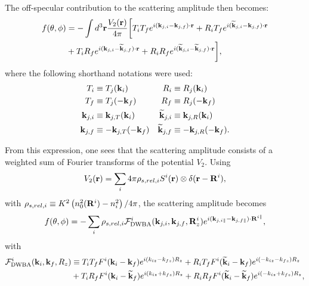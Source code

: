 The off-specular contribution to the scattering amplitude then becomes:
\begin{align*}
  f(\theta, \phi) &= -\int d^3\mathbf{r} \frac{V_2(\mathbf{r})}{4\pi} \biggl[ T_iT_fe^{i(\mathbf{k}_{j,i}-\mathbf{k}_{j,f})\cdot\mathbf{r}} + R_iT_fe^{i(\mathbf{\widetilde{k}}_{j,i}-\mathbf{k}_{j,f})\cdot\mathbf{r}} \\
   & + T_iR_fe^{i(\mathbf{k}_{j,i}-\mathbf{\widetilde{k}}_{j,f})\cdot\mathbf{r}} + R_iR_fe^{i(\mathbf{\widetilde{k}}_{j,i}-\mathbf{\widetilde{k}}_{j,f})\cdot\mathbf{r}} \biggr],
\end{align*}
where the following shorthand notations were used:
\begin{align*}
  T_i &\equiv  T_j(\mathbf{k}_i) & R_i &\equiv  R_j(\mathbf{k}_i)  \\
  T_f &\equiv  T_j(-\mathbf{k}_f) & R_f &\equiv  R_j(-\mathbf{k}_f) \\
  \mathbf{k}_{j,i} &\equiv \mathbf{k}_{j,T}(\mathbf{k}_i) & \mathbf{\widetilde{k}}_{j,i} &\equiv \mathbf{k}_{j,R}(\mathbf{k}_i)  \\
  \mathbf{k}_{j,f} &\equiv -\mathbf{k}_{j,T}(-\mathbf{k}_f) & \mathbf{\widetilde{k}}_{j,f} &\equiv -\mathbf{k}_{j,R}(-\mathbf{k}_f).
\end{align*}

From this expression, one sees that the scattering amplitude consists of a weighted sum of Fourier transforms of the potential $V_2$. Using
\begin{equation*}
  V_2(\mathbf{r}) = \sum_i 4\pi \rho_{s,rel,i} S^i(\mathbf{r}) \otimes \delta(\mathbf{r} - \mathbf{R}^i),
\end{equation*}
with $\rho_{s,rel,i}\equiv  K^2\left( n_0^2(\mathbf{R}^i) - n_i^2 \right)/4\pi$, the scattering amplitude becomes
\begin{equation*}
  f(\theta, \phi) = -\sum_i  \rho_{s,rel,i} \mathcal{F}^i_{\text{DWBA}}(\mathbf{k}_{j,i},\mathbf{k}_{j,f},\mathbf{R}^i_z)e^{i(\mathbf{k}_{j,i\parallel}-\mathbf{k}_{j,f\parallel})\cdot \mathbf{R}^{i\parallel} },
\end{equation*}
with
\begin{align*}
  \mathcal{F}^i_\text{DWBA}(\mathbf{k}_i,\mathbf{k}_f,R_z) & \equiv T_iT_fF^i(\mathbf{k}_i-\mathbf{k}_f)e^{i(k_{iz}-k_{fz})R_z} + R_iT_fF^i(\mathbf{\widetilde{k}}_i-\mathbf{k}_f)e^{i(-k_{iz}-k_{fz})R_z} \\
  & + T_iR_fF^i(\mathbf{k}_i-\mathbf{\widetilde{k}}_f)e^{i(k_{iz}+k_{fz})R_z} + R_iR_fF^i(\mathbf{\widetilde{k}}_i-\mathbf{\widetilde{k}}_f)e^{i(-k_{iz}+k_{fz})R_z},
\end{align*}

